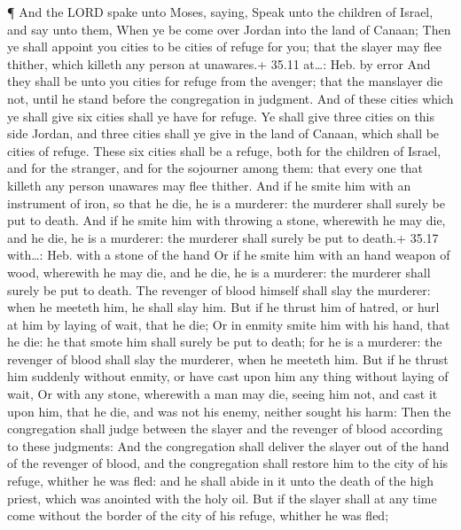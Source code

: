  ¶ And the LORD spake unto Moses, saying, 
Speak unto the children of Israel, and say unto them, When ye be come
over Jordan into the land of Canaan;  Then ye shall appoint
you cities to be cities of refuge for you; that the slayer may flee
thither, which killeth any person at unawares.+ 35.11 at\ldots: Heb. by
error  And they shall be unto you cities for refuge from
the avenger; that the manslayer die not, until he stand before the
congregation in judgment.  And of these cities which ye
shall give six cities shall ye have for refuge.  Ye shall
give three cities on this side Jordan, and three cities shall ye give in
the land of Canaan, which shall be cities of refuge.  These
six cities shall be a refuge, both for the children of Israel, and for
the stranger, and for the sojourner among them: that every one that
killeth any person unawares may flee thither.  And if he
smite him with an instrument of iron, so that he die, he is a murderer:
the murderer shall surely be put to death.  And if he smite
him with throwing a stone, wherewith he may die, and he die, he is a
murderer: the murderer shall surely be put to death.+ 35.17 with\ldots:
Heb. with a stone of the hand  Or if he smite him with an
hand weapon of wood, wherewith he may die, and he die, he is a murderer:
the murderer shall surely be put to death.  The revenger of
blood himself shall slay the murderer: when he meeteth him, he shall
slay him.  But if he thrust him of hatred, or hurl at him
by laying of wait, that he die;  Or in enmity smite him
with his hand, that he die: he that smote him shall surely be put to
death; for he is a murderer: the revenger of blood shall slay the
murderer, when he meeteth him.  But if he thrust him
suddenly without enmity, or have cast upon him any thing without laying
of wait,  Or with any stone, wherewith a man may die,
seeing him not, and cast it upon him, that he die, and was not his
enemy, neither sought his harm:  Then the congregation
shall judge between the slayer and the revenger of blood according to
these judgments:  And the congregation shall deliver the
slayer out of the hand of the revenger of blood, and the congregation
shall restore him to the city of his refuge, whither he was fled: and he
shall abide in it unto the death of the high priest, which was anointed
with the holy oil.  But if the slayer shall at any time
come without the border of the city of his refuge, whither he was fled;
